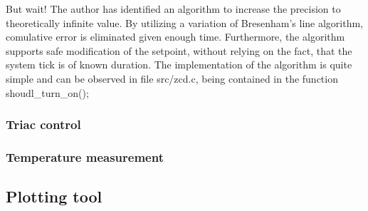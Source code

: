 \par
But wait!
The author has identified an algorithm to increase the precision to theoretically infinite value.
By utilizing a variation of Bresenham's line algorithm, comulative error is eliminated given enough time.
Furthermore, the algorithm supports safe modification of the setpoint, without relying on the fact, that the system tick is of known duration.
The implementation of the algorithm is quite simple and can be observed in file src/zcd.c, being contained in the function shoudl\_turn\_on();

\subsubsection{Triac control}
\subsubsection{Temperature measurement}
\subsection{Plotting tool}
